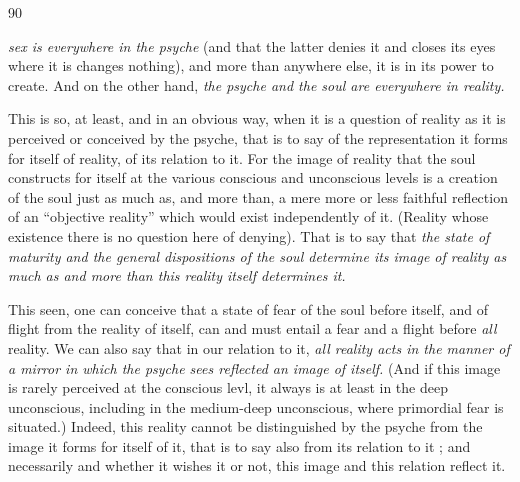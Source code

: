 90

\textit{sex is everywhere in the psyche} (and that the latter denies it and closes its eyes where it is changes nothing), and more than anywhere else, it is in its power to create. And on the other hand, \textit{the psyche and the soul are everywhere in reality.}

This is so, at least, and in an obvious way, when it is a question of reality as it is perceived or conceived by the psyche, that is to say of the representation it forms for itself of  reality, of its relation to it. For the image of reality that the soul constructs for itself at the various conscious and unconscious levels is a creation of the soul just as much as, and more than, a mere more or less faithful reflection of an ``objective reality'' which would exist independently of it. (Reality whose existence there is no question here of denying). That is to say that \textit{the state of maturity and the general dispositions of the soul determine its image of reality as much as and more than this reality itself determines it.}
\margin{$\cdot$}

This seen, one can conceive that a state of fear of the soul before itself, and of flight from the reality of itself, can and must entail a fear and a flight before \textit{all} reality. We can also say that in our relation to it, \textit{all reality acts in the manner of a \textnormal{mirror} in which the psyche sees reflected an image of itself.} (And if this image is rarely perceived at the conscious levl, it always is at least in the deep unconscious, including in the medium-deep unconscious, where primordial fear is situated.) Indeed, this reality cannot be distinguished by the psyche from the image it forms for itself of it, that is to say also from its relation to it ; and necessarily and whether it wishes it or not, this image and this relation reflect it.
\margin{$\cdot$}


